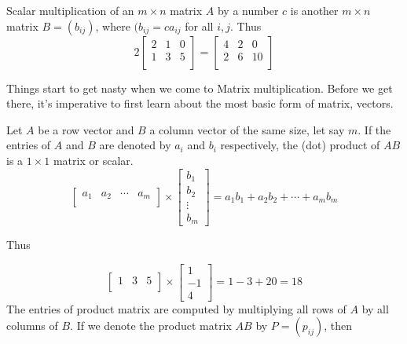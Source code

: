 \noindent Scalar multiplication of an $m \times n$ matrix $A$ by a number $c$ is another $m \times n$ matrix $B=(b_{ij})$, where $(b_{ij}=ca_{ij}$ for all $i,j$. Thus
\begin{equation}
	2\begin{bmatrix}
		2&1  &0  \\
		1& 3 &5  \\
	\end{bmatrix}=\begin{bmatrix}
		4 & 2 & 0 \\
		2 & 6 & 10 \\
	\end{bmatrix}
\end{equation}

\noindent Things start to get nasty when we come to Matrix multiplication. Before we get there, it's imperative to first learn about the most basic form of matrix, vectors.

\noindent Let $A$ be a row vector and $B$ a column vector of the same size, let say $m$. If the entries of $A$ and $B$ are denoted by $a_i$ and $b_i$ respectively, the (dot) product of $AB$ is a $1 \times 1$ matrix or scalar.
\begin{equation}
	\begin{bmatrix}
		a_1& a_2  & \cdots &a_m  \\
	\end{bmatrix}\times
	\begin{bmatrix}
		b_1 \\
		b_2 \\
		\vdots \\
		b_m
	\end{bmatrix}=a_1b_1+a_2b_2+\cdots+a_mb_m
\end{equation}

\noindent Thus

\begin{equation}
	\begin{bmatrix}
		1& 3  & 5  \\
	\end{bmatrix}\times
	\begin{bmatrix}
		1 \\
		-1 \\
		4
	\end{bmatrix}=1-3+20=18
\end{equation}
\noindent The entries of product matrix are computed by multiplying all rows of $A$ by all columns of $B$. If we denote the product matrix $AB$ by $P=(p_{ij})$, then

